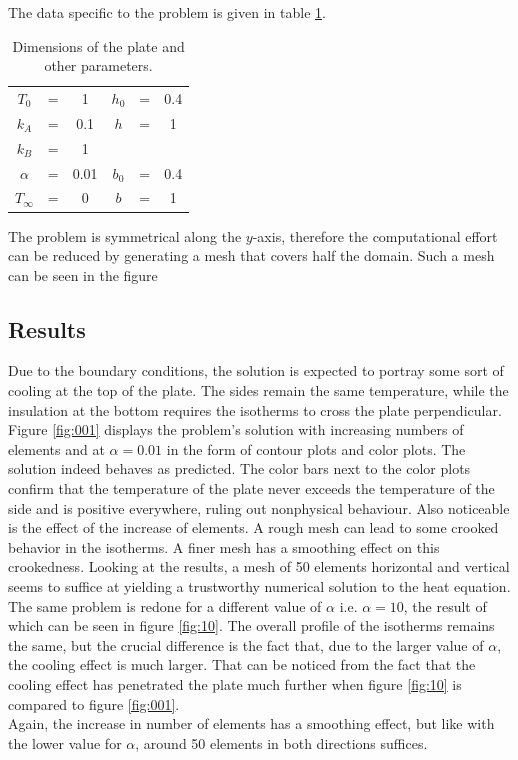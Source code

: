 \documentclass[10pt,a4paper]{article}
\begin{document}
The data specific to the problem is given in table \ref{table:dim}.

\begin{table}\label{tabel:dim}
\begin{center}

\begin{tabular}{cccccc}
$T_0$ & = & 1 & $h_0$ & = & 0.4\\
$k_A $ & =& 0.1 & $h$ & =&1\\
$k_B$ & = & 1\\
$\alpha$ & = & 0.01 & $b_0$ & = &0.4\\
$T_{\infty}$ &= & 0 & $b$ &=& 1
\end{tabular} 
\end{center}
\caption{Dimensions of the plate and other parameters.}
\label{table:dim}
\end{table}


The problem is symmetrical along the $y$-axis, therefore the computational effort can be reduced by generating a mesh that covers half the domain. Such a mesh can be seen in the figure %
\subsection{Results}
Due to the boundary conditions, the solution is expected to portray some sort of cooling at the top of the plate. The sides remain the same temperature, while the insulation at the bottom requires the isotherms to cross the plate perpendicular. \\


Figure \ref{fig:001} displays the problem's solution with increasing numbers of elements and at $\alpha = 0.01$ in the form of contour plots and color plots. The solution indeed behaves as predicted. The color bars next to the color plots confirm that the temperature of the plate never exceeds the temperature of the side and is positive everywhere, ruling out nonphysical behaviour.   Also noticeable is the effect of the increase of elements. A rough mesh can lead to some crooked behavior in the isotherms. A finer mesh has a smoothing effect on this crookedness. Looking at the results, a mesh of 50 elements horizontal and vertical seems to suffice at yielding a trustworthy numerical solution to the heat equation.\\

The same problem is redone for a different value of $\alpha$ i.e. $\alpha = 10$, the result of which can be seen in figure \ref{fig:10}. The overall profile of the isotherms remains the same, but the crucial difference is the fact that, due to the larger value of $\alpha$, the cooling effect is much larger. That can be noticed from the fact that the cooling effect has penetrated the plate much further when figure \ref{fig:10} is compared to figure \ref{fig:001}.\\
Again, the increase in number of elements has a smoothing effect, but like with the lower value for $\alpha$, around 50 elements in both directions suffices.
\end{document}
